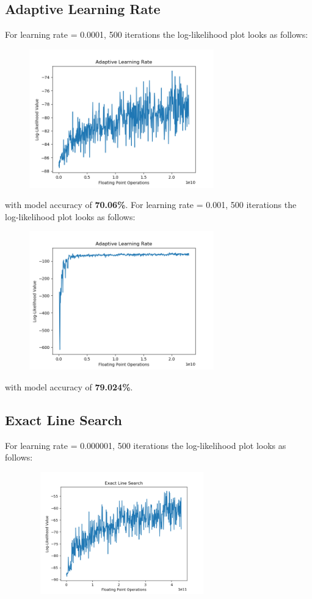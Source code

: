 \documentclass[a4paper]{article}
\begin{document}
\subsection*{Adaptive Learning Rate}
For learning rate = 0.0001, 500 iterations the log-likelihood plot looks as follows:
\begin{figure}[h!]
\centering
\includegraphics[width=8cm,height=6cm]{b_adlr_0001_500_7006.png}
\end{figure}

\noindent with model accuracy of \textbf{70.06\%}.
\vskip 0.1in
\noindent For learning rate = 0.001, 500 iterations the log-likelihood plot looks as follows:

\begin{figure}[h!]
\centering
\includegraphics[width=8cm,height=6cm]{b_adlr_001_500_79024.png}
\end{figure}

\noindent with model accuracy of \textbf{79.024\%}.

\subsection*{Exact Line Search}
For learning rate = 0.000001, 500 iterations the log-likelihood plot looks as follows:

\begin{figure}[h!]
\centering
\includegraphics[width=8cm,height=5.3cm]{b_els_000001_500_7994.png}
\end{figure}
\end{document}

